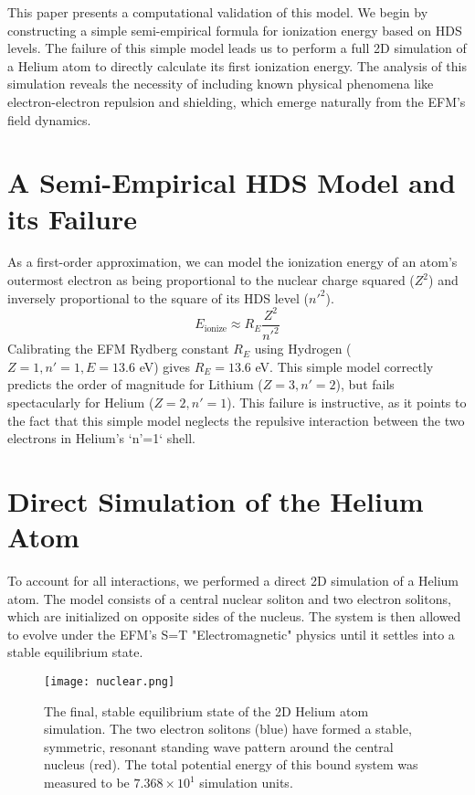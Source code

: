 \documentclass[11pt, twoside]{article}
\begin{document}
This paper presents a computational validation of this model. We begin by constructing a simple semi-empirical formula for ionization energy based on HDS levels. The failure of this simple model leads us to perform a full 2D simulation of a Helium atom to directly calculate its first ionization energy. The analysis of this simulation reveals the necessity of including known physical phenomena like electron-electron repulsion and shielding, which emerge naturally from the EFM's field dynamics.

\section{A Semi-Empirical HDS Model and its Failure}
As a first-order approximation, we can model the ionization energy of an atom's outermost electron as being proportional to the nuclear charge squared (\(Z^2\)) and inversely proportional to the square of its HDS level (\(n'^2\)).
\begin{equation}
E_{\text{ionize}} \approx R_E \frac{Z^2}{n'^2}
\end{equation}
Calibrating the EFM Rydberg constant \(R_E\) using Hydrogen (\(Z=1, n'=1, E=13.6\) eV) gives \(R_E=13.6\) eV. This simple model correctly predicts the order of magnitude for Lithium (\(Z=3, n'=2\)), but fails spectacularly for Helium (\(Z=2, n'=1\)). This failure is instructive, as it points to the fact that this simple model neglects the repulsive interaction between the two electrons in Helium's `n'=1` shell.

\section{Direct Simulation of the Helium Atom}
To account for all interactions, we performed a direct 2D simulation of a Helium atom. The model consists of a central nuclear soliton and two electron solitons, which are initialized on opposite sides of the nucleus. The system is then allowed to evolve under the EFM's S=T "Electromagnetic" physics until it settles into a stable equilibrium state.

\begin{figure}[htbp!]
\centering
\texttt{[image: nuclear.png]}
\caption{The final, stable equilibrium state of the 2D Helium atom simulation. The two electron solitons (blue) have formed a stable, symmetric, resonant standing wave pattern around the central nucleus (red). The total potential energy of this bound system was measured to be \(7.368 \times 10^{1}\) simulation units.}
\label{fig:helium_sim}
\end{figure}
\end{document}
